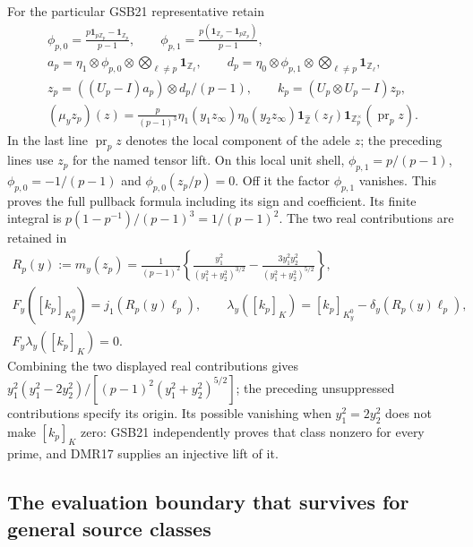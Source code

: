 For the particular GSB21 representative retain
\begin{equation}\tag{DMR22}
\begin{gathered}
\phi_{p,0}=\frac{p\mathbf1_{p\mathbb Z_p}
                             -\mathbf1_{\mathbb Z_p}}{p-1},\qquad
\phi_{p,1}=\frac{p(\mathbf1_{\mathbb Z_p}
                             -\mathbf1_{p\mathbb Z_p})}{p-1},\\
a_p=\eta_1\otimes\phi_{p,0}\otimes
              \bigotimes_{\ell\ne p}\mathbf1_{\mathbb Z_\ell},\qquad
d_p=\eta_0\otimes\phi_{p,1}\otimes
              \bigotimes_{\ell\ne p}\mathbf1_{\mathbb Z_\ell},\\
z_p=((U_p-I)a_p)\otimes d_p/(p-1),\qquad
k_p=(U_p\otimes U_p-I)z_p,\\
(\mu_yz_p)(z)=\frac p{(p-1)^3}
 \eta_1(y_1z_\infty)\eta_0(y_2z_\infty)
 \mathbf1_{\widehat{\mathbb Z}}(z_f)
 \mathbf1_{\mathbb Z_p^\times}(\operatorname{pr}_p z).
\end{gathered}
\end{equation}
In the last line $\operatorname{pr}_p z$ denotes the local
component of the adele $z$; the preceding lines use $z_p$ for
the named tensor lift.
On this local unit shell, $\phi_{p,1}=p/(p-1)$,
$\phi_{p,0}=-1/(p-1)$ and $\phi_{p,0}(z_p/p)=0$.
Off it the factor $\phi_{p,1}$ vanishes. This proves the full
pullback formula including its sign and coefficient.
Its finite integral is
$p(1-p^{-1})/(p-1)^3=1/(p-1)^2$. The two real contributions
are retained in
\begin{equation}\tag{DMR23}
\begin{gathered}
R_p(y):=m_y(z_p)=\frac1{(p-1)^2}
\left\{\frac{y_1^2}{(y_1^2+y_2^2)^{3/2}}
       -\frac{3y_1^2y_2^2}{(y_1^2+y_2^2)^{5/2}}\right\},\\
F_y([k_p]_{K_y^0})=j_1(R_p(y)\ell_p),\qquad
\lambda_y([k_p]_K)=[k_p]_{K_y^0}-\delta_y(R_p(y)\ell_p),\\
F_y\lambda_y([k_p]_K)=0.
\end{gathered}
\end{equation}
Combining the two displayed real contributions gives
$y_1^2(y_1^2-2y_2^2)/[(p-1)^2(y_1^2+y_2^2)^{5/2}]$;
the preceding unsuppressed contributions specify its origin.
Its possible vanishing when $y_1^2=2y_2^2$ does not make
$[k_p]_K$ zero: GSB21 independently proves that class nonzero
for every prime, and DMR17 supplies an injective lift of it.

\subsection{The evaluation boundary that survives for general source classes}

